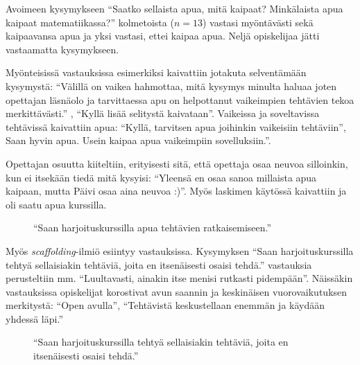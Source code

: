 Avoimeen kysymykseen ``Saatko sellaista apua, mitä kaipaat? Minkälaista apua kaipaat matematiikassa?'' kolmetoista ($n=13$) vastasi myöntävästi sekä kaipaavansa apua ja yksi vastasi, ettei kaipaa apua. Neljä opiskelijaa jätti vastaamatta kysymykseen. 

Myönteisissä vastauksissa esimerkiksi kaivattiin jotakuta selventämään kysymystä: ``Välillä on vaikea hahmottaa, mitä kysymys minulta haluaa joten opettajan läsnäolo ja tarvittaessa apu on helpottanut vaikeimpien tehtävien tekoa merkittävästi.'' , ``Kyllä lisää selitystä kaivataan''. Vaikeissa ja soveltavissa tehtävissä kaivattiin apua: ``Kyllä, tarvitsen apua joihinkin vaikeisiin tehtäviin'', Saan hyvin apua. Usein kaipaa apua vaikeimpiin sovelluksiin.''. 

Opettajan osuutta kiiteltiin, erityisesti sitä, että opettaja osaa neuvoa silloinkin, kun ei itsekään tiedä mitä kysyisi: ``Yleensä en osaa sanoa millaista apua kaipaan, mutta Päivi osaa aina neuvoa :)''. Myös laskimen käytössä kaivattiin ja oli saatu apua kurssilla. 

\begin{figure}[h!]
\centering
{}
\caption{``Saan harjoituskurssilla apua tehtävien ratkaisemiseen.''}
\end{figure}

Myös \emph{scaffolding}-ilmiö esiintyy vastauksissa. Kysymyksen ``Saan harjoituskurssilla tehtyä sellaisiakin tehtäviä, joita en itsenäisesti osaisi tehdä.'' vastauksia perusteltiin mm. ``Luultavasti, ainakin itse menisi rutkasti pidempään''. Näissäkin vastauksissa opiskelijat korostivat avun saannin ja keskinäisen vuorovaikutuksen merkitystä: ``Open avulla'', ``Tehtävistä keskustellaan enemmän ja käydään yhdessä läpi.''

\begin{figure}[h!]
\centering
{}
\caption{``Saan harjoituskurssilla tehtyä sellaisiakin tehtäviä, joita en itsenäisesti osaisi tehdä.''}
\end{figure}

